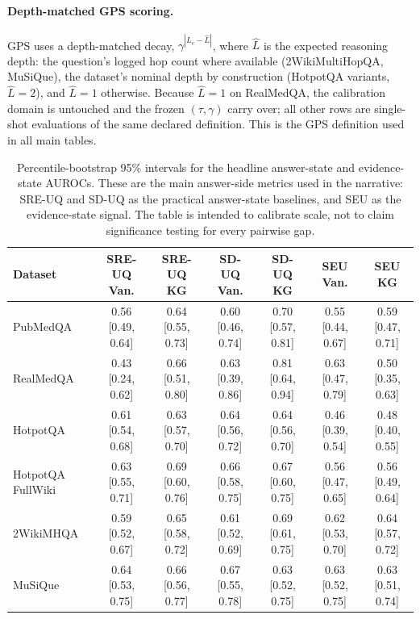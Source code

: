 \paragraph{Depth-matched GPS scoring.}
GPS uses a depth-matched decay, $\gamma^{|L_e - \hat{L}|}$, where $\hat{L}$ is
the expected reasoning depth: the question's logged hop count where available
(2WikiMultiHopQA, MuSiQue), the dataset's nominal depth by construction
(HotpotQA variants, $\hat{L}=2$), and $\hat{L}=1$ otherwise.
Because $\hat{L}=1$ on RealMedQA, the calibration domain is untouched and the
frozen $(\tau, \gamma)$ carry over; all other rows are single-shot
evaluations of the same declared definition.
This is the GPS definition used in all main tables.

\begin{table}[t]
\centering
\scriptsize
\caption{Percentile-bootstrap 95\% intervals for the headline answer-state and
evidence-state AUROCs.
These are the main answer-side metrics used in the narrative: SRE-UQ and
SD-UQ as the practical answer-state baselines, and SEU as the evidence-state signal.
The table is intended to calibrate scale, not to claim significance testing
for every pairwise gap.
\label{tab:headline_ci_output}}
\begin{tabular}{@{}lcccccc@{}}
\toprule
Dataset & SRE-UQ Van. & SRE-UQ KG & SD-UQ Van. & SD-UQ KG & SEU Van. & SEU KG \\
\midrule
PubMedQA & 0.56 [0.49, 0.64] & 0.64 [0.55, 0.73] & 0.60 [0.46, 0.74] & 0.70 [0.57, 0.81] & 0.55 [0.44, 0.67] & 0.59 [0.47, 0.71] \\
RealMedQA & 0.43 [0.24, 0.62] & 0.66 [0.51, 0.80] & 0.63 [0.39, 0.86] & 0.81 [0.64, 0.94] & 0.63 [0.47, 0.79] & 0.50 [0.35, 0.63] \\
HotpotQA & 0.61 [0.54, 0.68] & 0.63 [0.57, 0.70] & 0.64 [0.56, 0.72] & 0.64 [0.56, 0.70] & 0.46 [0.39, 0.54] & 0.48 [0.40, 0.55] \\
HotpotQA FullWiki & 0.63 [0.55, 0.71] & 0.69 [0.60, 0.76] & 0.66 [0.58, 0.75] & 0.67 [0.60, 0.75] & 0.56 [0.47, 0.65] & 0.56 [0.49, 0.64] \\
2WikiMHQA & 0.59 [0.52, 0.67] & 0.65 [0.58, 0.72] & 0.61 [0.52, 0.69] & 0.69 [0.61, 0.75] & 0.62 [0.53, 0.70] & 0.64 [0.57, 0.72] \\
MuSiQue & 0.64 [0.53, 0.75] & 0.66 [0.56, 0.77] & 0.67 [0.55, 0.78] & 0.63 [0.52, 0.75] & 0.63 [0.52, 0.75] & 0.63 [0.51, 0.74] \\
\bottomrule
\end{tabular}
\end{table}

